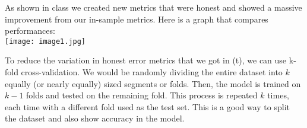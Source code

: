 \documentclass[12pt]{article}
\begin{document}
\begin{enumerate}

As shown in class we created new metrics that were honest and showed a massive improvement from our in-sample metrics. Here is a graph that compares performances: \\
\texttt{[image: image1.jpg]}


To reduce the variation in honest error metrics that we got in (t), we can use k-fold cross-validation. We would be randomly dividing the entire dataset into \(k\) equally (or nearly equally) sized segments or folds. Then, the model is trained on \(k-1\) folds and tested on the remaining fold. This process is repeated \(k\) times, each time with a different fold used as the test set. This is a good way to split the dataset and also show accuracy in the model.


\end{enumerate}


\end{document}
